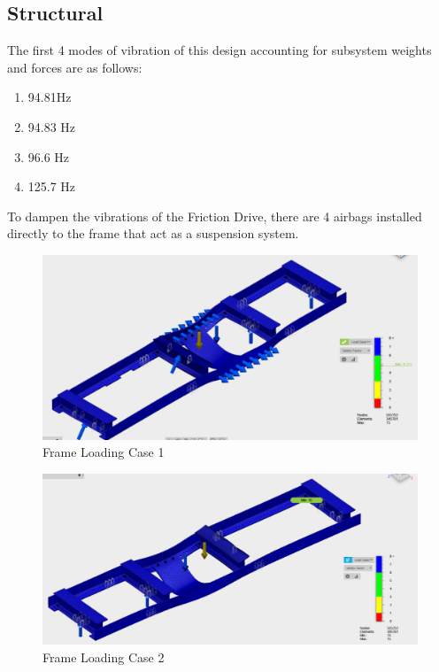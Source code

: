 \documentclass[main.tex]{subfiles}
\begin{document}
    \subsection{Structural}
    The first 4 modes of vibration of this design accounting for subsystem weights and forces are as follows:
    \begin{enumerate}
    	\item 94.81Hz
    	\item 94.83 Hz
    	\item 96.6 Hz
    	\item 125.7 Hz
    \end{enumerate}
	To dampen the vibrations of the Friction Drive, there are 4 airbags installed directly to the frame that act as a suspension system.\\
    \begin{figure}
        \centering
        \includegraphics[width=\linewidth]{images/frame1}
        \caption{Frame Loading Case 1}
        \label{fig:frame1}
    \end{figure}
    \begin{figure}
        \centering
        \includegraphics[width=\linewidth]{images/frame2}
        \caption{Frame Loading Case 2}
        \label{fig:frame2}
    \end{figure}
\end{document}
